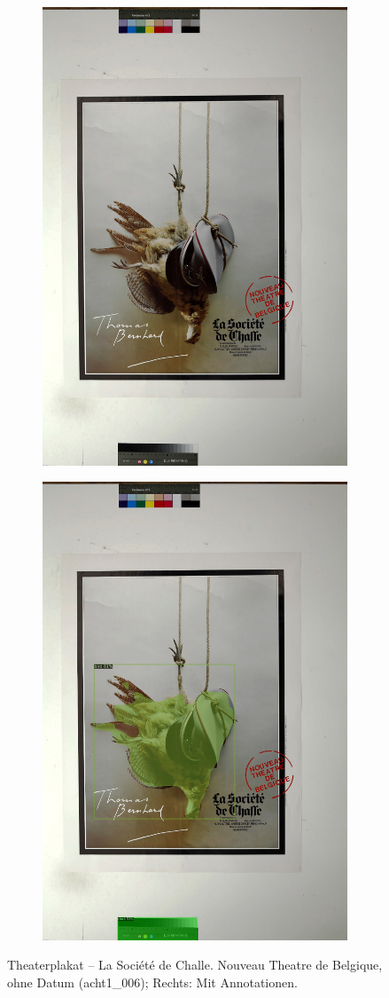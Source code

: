 \documentclass[a4paper,12pt,ngerman]{article}
\begin{document}
\newpage
\begin{landscape}
\begin{figure}[ht]
	\begin{subfigure}[b]{0.5\linewidth}
	\centering
	\includegraphics[height=\linewidth]{Abbildung_17_(acht1_006)}
	\end{subfigure}
	\begin{subfigure}[b]{0.5\linewidth}
	\centering
	\includegraphics[height=\linewidth]{Abbildung_17_(acht1_006)_with_detections}
	\end{subfigure}
	\caption{Theaterplakat -- La Société de Challe. Nouveau Theatre de Belgique, ohne Datum (acht1\_006); Rechts: Mit Annotationen.}
\end{figure}
\end{landscape}
\end{document}
